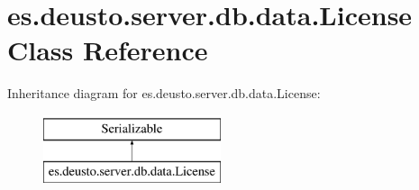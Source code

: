 \hypertarget{classes_1_1deusto_1_1server_1_1db_1_1data_1_1_license}{}\section{es.\+deusto.\+server.\+db.\+data.\+License Class Reference}
\label{classes_1_1deusto_1_1server_1_1db_1_1data_1_1_license}
Inheritance diagram for es.\+deusto.\+server.\+db.\+data.\+License\+:\begin{figure}[H]
\begin{center}
\leavevmode
\includegraphics[height=2.000000cm]{classes_1_1deusto_1_1server_1_1db_1_1data_1_1_license}
\end{center}
\end{figure}
